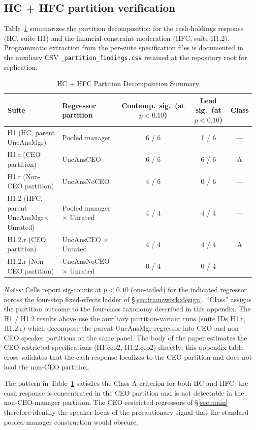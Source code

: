 \subsection{HC + HFC partition verification}

Table~\ref{tab:partition_hc_summary} summarizes the partition decomposition for the cash-holdings response (HC, suite H1) and the financial-constraint moderation (HFC, suite H1.2). Programmatic extraction from the per-suite specification files is documented in the auxiliary CSV \texttt{\_partition\_findings.csv} retained at the repository root for replication.

\begin{table}[htbp]
\centering
\caption{HC + HFC Partition Decomposition Summary}
\label{tab:partition_hc_summary}
\small
\begin{tabular}{llccc}
\toprule
Suite & Regressor partition & Contemp.\ sig.~(at $p<0.10$) & Lead sig.~(at $p<0.10$) & Class \\
\midrule
H1 (HC, parent UncAnsMgr) & Pooled manager & 6 / 6 & 1 / 6 & --- \\
\hspace{1em}H1.r (CEO partition) & UncAnsCEO & 6 / 6 & 6 / 6 & A \\
\hspace{1em}H1.r (Non-CEO partition) & UncAnsNoCEO & 4 / 6 & 0 / 6 & --- \\
\midrule
H1.2 (HFC, parent UncAnsMgr$\times$Unrated) & Pooled manager $\times$ Unrated & 4 / 4 & 4 / 4 & --- \\
\hspace{1em}H1.2.r (CEO partition) & UncAnsCEO $\times$ Unrated & 4 / 4 & 4 / 4 & A \\
\hspace{1em}H1.2.r (Non-CEO partition) & UncAnsNoCEO $\times$ Unrated & 0 / 4 & 0 / 4 & --- \\
\bottomrule
\end{tabular}
\begin{minipage}{\linewidth}
\vspace{4pt}\scriptsize
\textit{Notes:} Cells report sig-counts at $p<0.10$ (one-tailed) for the indicated regressor across the four-step fixed-effects ladder of \S\ref{sec:framework:design}. ``Class'' assigns the partition outcome to the four-class taxonomy described in this appendix. The H1 / H1.2 results above use the auxiliary partition-variant runs (suite IDs H1.r, H1.2.r) which decompose the parent UncAnsMgr regressor into CEO and non-CEO speaker partitions on the same panel. The body of the paper estimates the CEO-restricted specifications (H1.ceo2, H1.2.ceo2) directly; this appendix table cross-validates that the cash response localizes to the CEO partition and does not load the non-CEO partition.
\end{minipage}
\end{table}

The pattern in Table~\ref{tab:partition_hc_summary} satisfies the Class A criterion for both HC and HFC: the cash response is concentrated in the CEO partition and is not detectable in the non-CEO-manager partition. The CEO-restricted regressors of \S\ref{sec:main} therefore identify the speaker locus of the precautionary signal that the standard pooled-manager construction would obscure.

